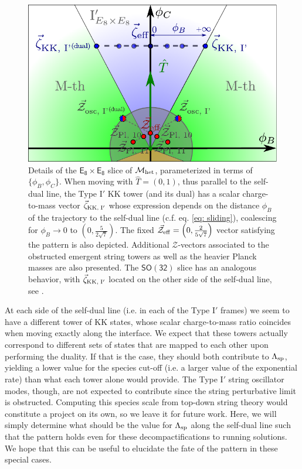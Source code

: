 \begin{figure}[htb]
\begin{center}
	\includegraphics[scale=0.8]{sliding.pdf}
	\caption{\small Details of the $\mathsf{E_8\times E_8}$ slice of $\mathcal{M}_{\rm het}$, parameterized in terms of $\{\phi_B,\phi_C \}$. When moving with $\hat{T}=(0,1)$, thus parallel to the self-dual line, the Type I$'$ KK tower (and its dual) has a scalar charge-to-mass vector $\vec{\zeta}_{\rm KK,\; I'}$ whose expression depends on the distance $\phi_B$ of the trajectory to the self-dual line (c.f. eq. \eqref{eq: sliding}), coalescing for $\phi_B\to 0$ to $(0,\frac{5}{2\sqrt{7}})$. The fixed $\vec{\mathcal{Z}}_{\rm eff}=\left(0,\frac{2}{5\sqrt{7}} \right)$ vector satisfying the pattern is also depicted. Additional $\mathcal{Z}$-vectors associated to the obstructed emergent string towers as well as the heavier Planck masses are also presented. The $\mathsf{SO(32)}$ slice has an analogous behavior, with $\vec{\zeta}_{\rm KK,\;I'}$ located on the other side of the self-dual line, see \cite{Etheredge:2023odp}.} 
\label{fig:sliding}
\end{center}
\end{figure}
At each side of the self-dual line (i.e. in each of the Type I$'$ frames) we seem to have a different tower of KK states, whose scalar charge-to-mass ratio coincides when moving exactly along the interface. We expect that these towers actually correspond to different sets of states that are mapped to each other upon performing the duality. If that is the case, they should both contribute to $\Lambda_{\text{sp}}$, yielding a lower value for the species cut-off (i.e. a larger value of the exponential rate) than what each tower alone would provide. The Type I$'$ string oscillator modes, though, are not expected to contribute since the string perturbative limit is obstructed. Computing this species scale from top-down string theory would constitute a project on its own, so we leave it for future work. Here, we will simply determine what should be the value for $\Lambda_{\text{sp}}$ along the self-dual line such that the pattern holds even for these decompactifications to running solutions. We hope that this can be useful to elucidate the fate of the pattern in these special cases.
	
